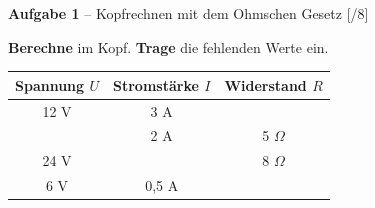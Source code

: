 \documentclass[11pt, a4paper]{article}
\newif\ifzeigesternchen
\newcommand{\punktebox}[1]{\hfill\small\textcolor{mittelgrau}{[\hspace{0.8em}/#1]}}
\newcommand{\stern}[1]{\ifzeigesternchen\textsuperscript{\textcolor{fachfarbe}{(#1)}}\fi}
\newcommand{\aufgabe}[2]{%
    \needspace{4\baselineskip}%
    \vspace{8pt}%
    \noindent\textbf{\textcolor{fachfarbe}{Aufgabe #1}} #2%
    \vspace{4pt}%
    \nopagebreak[4]%
}
\newcommand{\operator}[1]{\textbf{#1}}
\begin{document}

\aufgabe{1}{\stern{*} – Kopfrechnen mit dem Ohmschen Gesetz} \punktebox{8}

\operator{Berechne} im Kopf. \operator{Trage} die fehlenden Werte ein.

\vspace{0.5em}
\begin{center}
\begin{tabular}{|c|c|c|}
\hline
\textbf{Spannung $U$} & \textbf{Stromstärke $I$} & \textbf{Widerstand $R$} \\
\hline
12 V & 3 A & \\[0.8em]
\hline
 & 2 A & 5 $\Omega$ \\[0.8em]
\hline
24 V &  & 8 $\Omega$ \\[0.8em]
\hline
6 V & 0,5 A & \\[0.8em]
\hline
\end{tabular}
\end{center}

\end{document}

